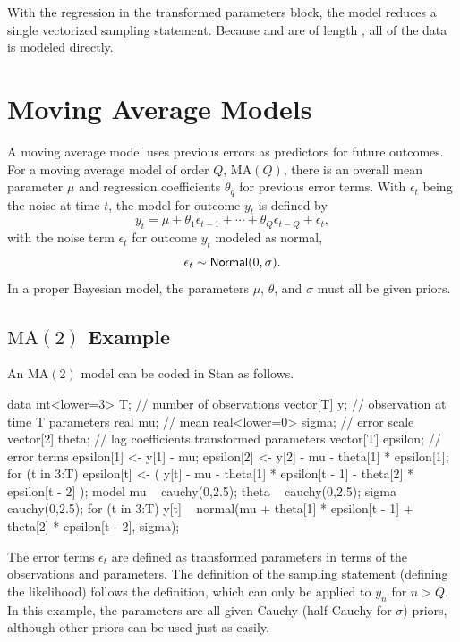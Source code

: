 With the regression in the transformed parameters block, the model
reduces a single vectorized sampling statement.  Because  and
 are of length , all of the data is modeled
directly.


\section{Moving Average Models}

A moving average model uses previous errors as predictors for future
outcomes.  For a moving average model of order $Q$, $\mbox{MA}(Q)$,
there is an overall mean parameter $\mu$ and regression coefficients
$\theta_q$ for previous error terms.  With $\epsilon_t$ being the
noise at time $t$, the model for outcome $y_t$ is defined by
\[
y_t = \mu + \theta_1 \epsilon_{t-1} + \cdots + \theta_Q \epsilon_{t-Q}
+ \epsilon_t,
\]
with the noise term $\epsilon_t$ for outcome $y_t$ modeled as
normal,
\[
\epsilon_t \sim \distro{Normal}(0,\sigma).
\]
In a proper Bayesian model, the parameters $\mu$, $\theta$, and
$\sigma$ must all be given priors.

\subsection{$\mbox{MA}(2)$ Example}

An $\mbox{MA}(2)$ model can be coded in Stan as follows.
%
\begin{stancode}
data {
  int<lower=3> T;  // number of observations
  vector[T] y;     // observation at time T
}
parameters {
  real mu;              // mean
  real<lower=0> sigma;  // error scale
  vector[2] theta;      // lag coefficients
}
transformed parameters {
  vector[T] epsilon;    // error terms
  epsilon[1] <- y[1] - mu;
  epsilon[2] <- y[2] - mu - theta[1] * epsilon[1];
  for (t in 3:T)
    epsilon[t] <- ( y[t] - mu
                    - theta[1] * epsilon[t - 1]
                    - theta[2] * epsilon[t - 2] );
}
model {
  mu ~ cauchy(0,2.5);
  theta ~ cauchy(0,2.5);
  sigma ~ cauchy(0,2.5);
  for (t in 3:T)
    y[t] ~ normal(mu 
                  + theta[1] * epsilon[t - 1]
                  + theta[2] * epsilon[t - 2],
                  sigma);
}
\end{stancode}
%
The error terms $\epsilon_t$ are defined as transformed parameters in
terms of the observations and parameters.  The definition of the
sampling statement (defining the likelihood) follows the definition,
which can only be applied to $y_n$ for $n > Q$.  In this example, the
parameters are all given Cauchy (half-Cauchy for $\sigma$) priors,
although other priors can be used just as easily.

